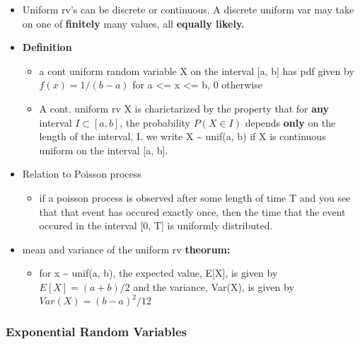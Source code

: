 \documentclass[
]{article}
\providecommand{\tightlist}{%
  \setlength{\itemsep}{0pt}\setlength{\parskip}{0pt}}
\begin{document}
\begin{itemize}
\tightlist
\item
  Uniform rv's can be discrete or continuous. A discrete uniform var may
  take on one of \textbf{finitely} many values, all \textbf{equally
  likely.}
\item
  \textbf{Definition}

  \begin{itemize}
  \tightlist
  \item
    a cont uniform random variable X on the interval {[}a, b{]} has pdf
    given by \(f(x) = 1/(b-a)\) for a \textless= x \textless= b, 0
    otherwise
  \item
    A cont. uniform rv X is charictarized by the property that for
    \textbf{any} interval \(I \subset [a, b]\), the probability
    \(P(X \in I)\) depends \textbf{only} on the length of the interval,
    I. we write X \textasciitilde{} unif(a, b) if X is continuous
    uniform on the interval {[}a, b{]}.
  \end{itemize}
\item
  Relation to Poisson process

  \begin{itemize}
  \tightlist
  \item
    if a poisson process is observed after some length of time T and you
    see that that event has occured exactly once, then the time that the
    event occured in the interval {[}0, T{]} is uniformly distributed.\\
  \end{itemize}
\item
  mean and variance of the uniform rv \textbf{theorum:}

  \begin{itemize}
  \tightlist
  \item
    for x \textasciitilde{} unif(a, b), the expected value, E{[}X{]}, is
    given by \(E[X] = (a+b)/2\) and the variance, Var(X), is given by
    \(Var(X) = (b-a)^2/12\)
  \end{itemize}
\end{itemize}

\hypertarget{exponential-random-variables}{%
\subsubsection{Exponential Random
Variables}\label{exponential-random-variables}}
\end{document}
